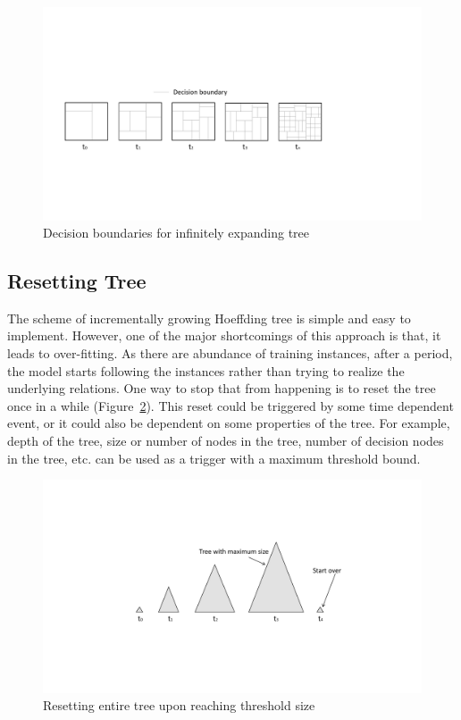\begin{figure}[htbp]
    \begin{center}
        \includegraphics[width=14.0cm]{figs/infgrowdb.pdf}
        \caption{Decision boundaries for infinitely expanding tree}
        \label{fig:algo:infgrowdb}
    \end{center}
\end{figure}


\subsection{Resetting Tree}
The scheme of incrementally growing Hoeffding tree is simple and easy to implement. However, one of the major shortcomings of this approach is that, it leads to over-fitting. As there are abundance of training instances, after a period, the model starts following the instances rather than trying to realize the underlying relations. One way to stop that from happening is to reset the tree once in a while (Figure~\ref{fig:algo:reset}). This reset could be triggered by some time dependent event, or it could also be dependent on some properties of the tree. For example, depth of the tree, size or number of nodes in the tree, number of decision nodes in the tree, etc. can be used as a trigger with a maximum threshold bound.

\begin{figure}[htbp]
    \begin{center}
        \includegraphics[width=12.0cm]{figs/reset.pdf}
        \caption{Resetting entire tree upon reaching threshold size}
        \label{fig:algo:reset}
    \end{center}
\end{figure}


